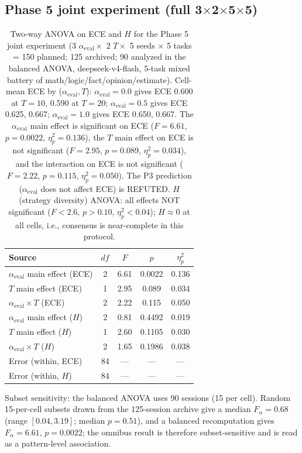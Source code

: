 \documentclass[11pt]{article}
\begin{document}
\subsection*{Phase 5 joint experiment (full 3$\times$2$\times$5$\times$5)}
\begin{table}[h]
\centering
\caption{Two-way ANOVA on ECE and $H$ for the Phase 5 joint experiment (3 $\alpha_{\text{eval}} \times$ 2 $T \times$ 5 seeds $\times$ 5 tasks = 150 planned; 125 archived; 90 analyzed in the balanced ANOVA, deepseek-v4-flash, 5-task mixed battery of math/logic/fact/opinion/estimate). Cell-mean ECE by ($\alpha_{\text{eval}}, T$): $\alpha_{\text{eval}}{=}0.0$ gives ECE 0.600 at $T{=}10$, 0.590 at $T{=}20$; $\alpha_{\text{eval}}{=}0.5$ gives ECE 0.625, 0.667; $\alpha_{\text{eval}}{=}1.0$ gives ECE 0.650, 0.667. The $\alpha_{\text{eval}}$ main effect is significant on ECE ($F = 6.61$, $p = 0.0022$, $\eta^2_p = 0.136$), the $T$ main effect on ECE is not significant ($F = 2.95$, $p = 0.089$, $\eta^2_p = 0.034$), and the interaction on ECE is not significant ($F = 2.22$, $p = 0.115$, $\eta^2_p = 0.050$). The P3 prediction ($\alpha_{\text{eval}}$ does not affect ECE) is REFUTED. $H$ (strategy diversity) ANOVA: all effects NOT significant ($F < 2.6$, $p > 0.10$, $\eta^2_p < 0.04$); $H \approx 0$ at all cells, i.e., consensus is near-complete in this protocol.}
\label{tab:joint-full-v10}
\begin{tabular}{@{}lcccc@{}}
\toprule
\textbf{Source} & \textbf{$df$} & \textbf{$F$} & \textbf{$p$} & \textbf{$\eta^2_p$} \\
\midrule
$\alpha_{\text{eval}}$ main effect (ECE) & 2 & 6.61 & 0.0022 & 0.136 \\
$T$ main effect (ECE) & 1 & 2.95 & 0.089 & 0.034 \\
$\alpha_{\text{eval}} \times T$ (ECE) & 2 & 2.22 & 0.115 & 0.050 \\
\midrule
$\alpha_{\text{eval}}$ main effect ($H$) & 2 & 0.81 & 0.4492 & 0.019 \\
$T$ main effect ($H$) & 1 & 2.60 & 0.1105 & 0.030 \\
$\alpha_{\text{eval}} \times T$ ($H$) & 2 & 1.65 & 0.1986 & 0.038 \\
\midrule
Error (within, ECE) & 84 & --- & --- & --- \\
Error (within, $H$) & 84 & --- & --- & --- \\
\bottomrule
\end{tabular}
\smallskip
{\footnotesize Subset sensitivity: the balanced ANOVA uses 90 sessions (15 per cell). Random 15-per-cell subsets drawn from the 125-session archive give a median $F_\alpha = 0.68$ (range $[0.04, 3.19]$; median $p = 0.51$), and a balanced recomputation gives $F_\alpha = 6.61$, $p = 0.0022$; the omnibus result is therefore subset-sensitive and is read as a pattern-level association.}
\end{table}
\end{document}
